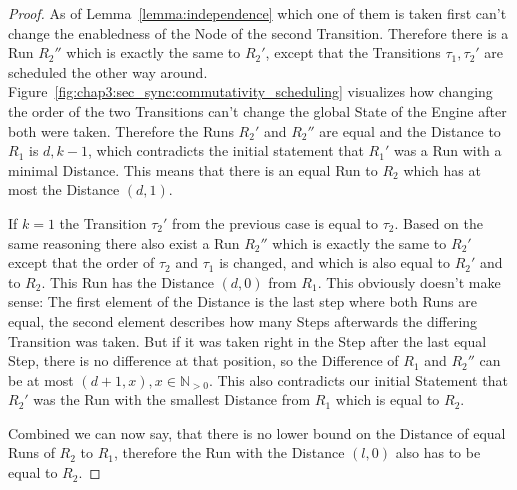 \begin{proof}
As of Lemma~\ref{lemma:independence} which one of them is taken first can't change the enabledness of the Node of the second Transition.
Therefore there is a Run \(R_2''\) which is exactly the same to \(R_2'\), except that the Transitions \(\tau_1, \tau_2'\) are scheduled the other way around.
Figure~\ref{fig:chap3:sec_sync:commutativity_scheduling} visualizes how changing the order of the two Transitions can't change the global State of the Engine after both were taken.
Therefore the Runs \(R_2'\) and \(R_2''\) are equal and the Distance to \(R_1\) is \(d, k-1\), which contradicts the initial statement that \(R_1'\) was a Run with a minimal Distance.
This means that there is an equal Run to \(R_2\) which has at most the Distance \((d, 1)\).

If \(k = 1\) the Transition \(\tau_2'\) from the previous case is equal to \(\tau_2\).
Based on the same reasoning there also exist a Run \(R_2''\) which is exactly the same to \(R_2'\) except that the order of \(\tau_2\) and \(\tau_1\) is changed, and which is also equal to \(R_2'\) and to \(R_2\).
This Run has the Distance \((d, 0)\) from \(R_1\).
This obviously doesn't make sense: The first element of the Distance is the last step where both Runs are equal, the second element describes how many Steps afterwards the differing Transition was taken.
But if it was taken right in the Step after the last equal Step, there is no difference at that position, so the Difference of \(R_1\) and \(R_2''\) can be at most \((d+1, x), x \in \mathbb{N}_{>0}\).
This also contradicts our initial Statement that \(R_2'\) was the Run with the smallest Distance from \(R_1\) which is equal to \(R_2\).

Combined we can now say, that there is no lower bound on the Distance of equal Runs of \(R_2\) to \(R_1\), therefore the Run with the Distance \((l, 0)\) also has to be equal to \(R_2\).

\end{proof}



